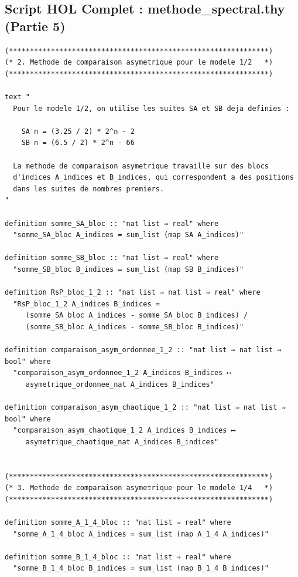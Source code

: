 \documentclass[a4paper,11pt]{article}
\begin{document}
\newpage
\subsection{Script HOL Complet : methode\_spectral.thy (Partie 5)}

\begin{holcode}[title={\textcolor{white}{Fichier : methode\_spectral.thy -- Partie 5/6}}]
\begin{lstlisting}
(**************************************************************)
(* 2. Methode de comparaison asymetrique pour le modele 1/2   *)
(**************************************************************)

text "
  Pour le modele 1/2, on utilise les suites SA et SB deja definies :

    SA n = (3.25 / 2) * 2^n - 2
    SB n = (6.5 / 2) * 2^n - 66

  La methode de comparaison asymetrique travaille sur des blocs
  d'indices A_indices et B_indices, qui correspondent a des positions
  dans les suites de nombres premiers.
"

definition somme_SA_bloc :: "nat list ⇒ real" where
  "somme_SA_bloc A_indices = sum_list (map SA A_indices)"

definition somme_SB_bloc :: "nat list ⇒ real" where
  "somme_SB_bloc B_indices = sum_list (map SB B_indices)"

definition RsP_bloc_1_2 :: "nat list ⇒ nat list ⇒ real" where
  "RsP_bloc_1_2 A_indices B_indices =
     (somme_SA_bloc A_indices - somme_SA_bloc B_indices) /
     (somme_SB_bloc A_indices - somme_SB_bloc B_indices)"

definition comparaison_asym_ordonnee_1_2 :: "nat list ⇒ nat list ⇒ bool" where
  "comparaison_asym_ordonnee_1_2 A_indices B_indices ⟷
     asymetrique_ordonnee_nat A_indices B_indices"

definition comparaison_asym_chaotique_1_2 :: "nat list ⇒ nat list ⇒ bool" where
  "comparaison_asym_chaotique_1_2 A_indices B_indices ⟷
     asymetrique_chaotique_nat A_indices B_indices"


(**************************************************************)
(* 3. Methode de comparaison asymetrique pour le modele 1/4   *)
(**************************************************************)

definition somme_A_1_4_bloc :: "nat list ⇒ real" where
  "somme_A_1_4_bloc A_indices = sum_list (map A_1_4 A_indices)"

definition somme_B_1_4_bloc :: "nat list ⇒ real" where
  "somme_B_1_4_bloc B_indices = sum_list (map B_1_4 B_indices)"


\end{lstlisting}
\end{holcode}
\end{document}

